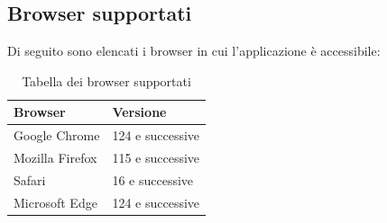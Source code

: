 \subsection{Browser supportati}

Di seguito sono elencati i browser in cui l’applicazione è accessibile:

\begin{table}[H]
\centering
\begin{tabular}{ll}
\hline
    \textbf{Browser} & \textbf{Versione} \\
    \hline
    Google Chrome     & 124 e successive \\
    \hline
    Mozilla Firefox   & 115 e successive \\
    \hline
    Safari            & 16 e successive  \\
    \hline
    Microsoft Edge    & 124 e successive \\
    \hline
\end{tabular}
\caption{Tabella dei browser supportati}
\label{tab:browser_supportati}
\end{table}

